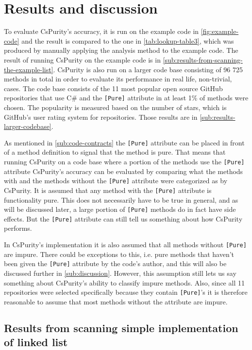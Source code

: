 \documentclass[a4paper,12pt]{article}
\begin{document}
\section{Results and discussion} \label{sec:results-and-discussion}

To evaluate CsPurity's accuracy, it is run on the example code in \autoref{fig:example-code} and the result is compared to the one in \autoref{tab:lookup-table3}, which was produced by manually applying the analysis method to the example code. The result of running CsPurity on the example code is in \autoref{sub:results-from-scanning-the-example-list}. CsPurity is also run on a larger code base consisting of 96 725 methods in total in order to evaluate its performance in real life, non-trivial, cases. The code base consists of the 11 most popular open source GitHub repositories that use C\# and the \texttt{[Pure]} attribute in at least 1\% of methods were chosen. The popularity is measured based on the number of stars, which is GitHub's user rating system for repositories. Those results are in \autoref{sub:results-larger-codebase}.

As mentioned in \autoref{sub:code-contracts} the \texttt{[Pure]} attribute can be placed in front of a method definition to signal that the method is pure. That means that running CsPurity on a code base where a portion of the methods use the \texttt{[Pure]} attribute CsPurity's accuracy can be evaluated by comparing what the methods with and the methods without the \texttt{[Pure]} attribute were categorized as by CsPurity. It is assumed that any method with the \texttt{[Pure]} attribute is functionality pure. This does not necessarily have to be true in general, and as will be discussed later, a large portion of \texttt{[Pure]} methods do in fact have side effects. But the \texttt{[Pure]} attribute can still tell us something about how CsPurity performs.

In CsPurity's implementation it is also assumed that all methods without \texttt{[Pure]} are impure. There could be exceptions to this, i.e. pure methods that haven't been given the \texttt{[Pure]} attribute by the code's author, and this will also be discussed further in \autoref{sub:discussion}. However, this assumption still lets us say something about CsPurity's ability to classify impure methods. Also, since all 11 repositories were selected specifically because they contain \texttt{[Pure]}'s it is therefore reasonable to assume that most methods without the attribute are impure.

\subsection{Results from scanning simple implementation of linked list} \label{sub:results-from-scanning-the-example-list}
\end{document}
